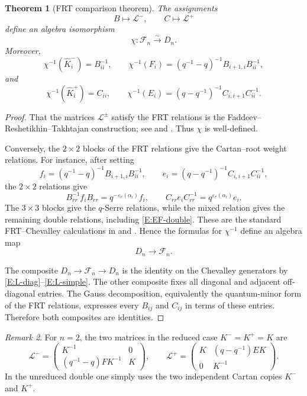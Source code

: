 \documentclass[11pt]{amsart}
\newtheorem{theorem}{Theorem}[section]
\theoremstyle{definition}
\theoremstyle{remark}
\newtheorem{remark}[theorem]{Remark}
\newcommand{\eps}{\varepsilon}
\begin{document}
\begin{theorem}[FRT comparison theorem]\label{T:FRT-comparison}
The assignments
\[
B\longmapsto\mathcal L^-,\qquad C\longmapsto\mathcal L^+
\]
define an algebra isomorphism
\[
\chi:\mathcal F_n\xrightarrow{\sim}D_n.
\]
Moreover,
\[
\chi^{-1}(\hat K_i^-)=B_{ii}^{-1},\qquad
\chi^{-1}(F_i)
=(q^{-1}-q)^{-1}B_{i+1,i}B_{ii}^{-1},
\]
and
\[
\chi^{-1}(\hat K_i^+)=C_{ii},\qquad
\chi^{-1}(E_i)
=(q-q^{-1})^{-1}C_{i,i+1}C_{ii}^{-1}.
\]
\end{theorem}

\begin{proof}
That the matrices \(\mathcal L^\pm\) satisfy the FRT relations is the
Faddeev--Reshetikhin--Takhtajan construction; see \cite{FRT} and
\cite[Chapter~8]{KS}.  Thus \(\chi\) is well-defined.

Conversely, the \(2\times2\) blocks of the FRT relations give the
Cartan--root weight relations.  For instance, after setting
\[
f_i=(q^{-1}-q)^{-1}B_{i+1,i}B_{ii}^{-1},\qquad
e_i=(q-q^{-1})^{-1}C_{i,i+1}C_{ii}^{-1},
\]
the \(2\times2\) relations give
\[
B_{rr}^{-1}f_iB_{rr}
=q^{-\eps_r(\alpha_i)}f_i,
\qquad
C_{rr}e_iC_{rr}^{-1}
=q^{\eps_r(\alpha_i)}e_i.
\]
The \(3\times3\) blocks give the \(q\)-Serre relations, while the mixed
relation gives the remaining double relations, including
\eqref{E:EF-double}.  These are the standard FRT--Chevalley calculations in
\cite{FRT} and \cite[Chapter~8]{KS}.  Hence the formulas for
\(\chi^{-1}\) define an algebra map
\[
D_n\longrightarrow\mathcal F_n.
\]

The composite \(D_n\to\mathcal F_n\to D_n\) is the identity on the
Chevalley generators by \eqref{E:L-diag}--\eqref{E:L-simple}.  The other
composite fixes all diagonal and adjacent off-diagonal entries.  The Gauss
decomposition, equivalently the quantum-minor form of the FRT relations,
expresses every \(B_{ij}\) and \(C_{ij}\) in terms of these entries.
Therefore both composites are identities.
\end{proof}

\begin{remark}
For \(n=2\), the two matrices in the reduced case \(K^-=K^+=K\) are
\[
\mathcal L^-=
\begin{pmatrix}
K^{-1}&0\\
(q^{-1}-q)FK^{-1}&K
\end{pmatrix},
\qquad
\mathcal L^+=
\begin{pmatrix}
K&(q-q^{-1})EK\\
0&K^{-1}
\end{pmatrix}.
\]
In the unreduced double one simply uses the two independent Cartan copies
\(K^-\) and \(K^+\).
\end{remark}
\end{document}
